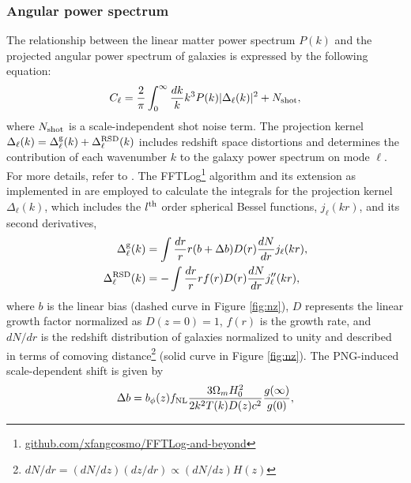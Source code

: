\subsubsection{Angular power spectrum}
The relationship between the linear matter power spectrum $P(k)$ and the projected angular power spectrum of galaxies is expressed by the following equation:
\begin{equation}\label{eq:cell}
C_{\ell} = \frac{2}{\pi}\int_{0}^{\infty}\frac{dk}{k}k^{3}P(k)|\Delta_{\ell}(k)|^{2} + N_{\rm shot},
\end{equation}
where $N_{\rm shot}$ is a scale-independent shot noise term. The projection kernel $\Delta_{\ell}(k) = \Delta^{\rm g}_{\ell}(k) + \Delta^{\rm RSD}_{\ell}(k)$ includes redshift space distortions and determines the contribution of each wavenumber $k$ to the galaxy power spectrum on mode $\ell$. For more details, refer to \cite{Padmanabhan2007}. The FFTLog\footnote{\href{https://github.com/xfangcosmo/FFTLog-and-beyond}{github.com/xfangcosmo/FFTLog-and-beyond}} algorithm and its extension as implemented in \cite{fang2020beyond} are employed to calculate the integrals for the projection kernel $\Delta_{\ell}(k)$, which includes the $l^{\rm th}$ order spherical Bessel functions, $ j_{\ell}(kr)$, and its second derivatives,
\begin{align}
    \Delta^{\rm g}_{\ell}(k) &= \int \frac{dr}{r} r (b+\Delta b) D(r) \frac{dN}{dr} j_{\ell}(kr),\\
    \Delta^{\rm RSD}_{\ell}(k) &= - \int \frac{dr}{r} r f(r) D(r) \frac{dN}{dr} j^{\prime\prime}_{\ell}(kr),
\end{align}
where $b$ is the linear bias (dashed curve in Figure \ref{fig:nz}), $D$ represents the linear growth factor normalized as $D(z=0)=1$, $f(r)$ is the growth rate, and $dN/dr$ is the redshift distribution of galaxies normalized to unity and described in terms of comoving distance\footnote{$dN/dr = (dN/dz)(dz/dr) \propto (dN/dz)H(z)$} (solid curve in Figure \ref{fig:nz}). The PNG-induced scale-dependent shift is given by \citep{slosar2008constraints}
\begin{equation}
\Delta b = b_{\phi}(z) f_{\rm NL} \frac{3 \Omega_{m} H^{2}_{0}}{2 k^{2}T(k)D(z) c^{2}} \frac{g(\infty)}{g(0)},
\label{eq:scaledepbias}
\end{equation}
